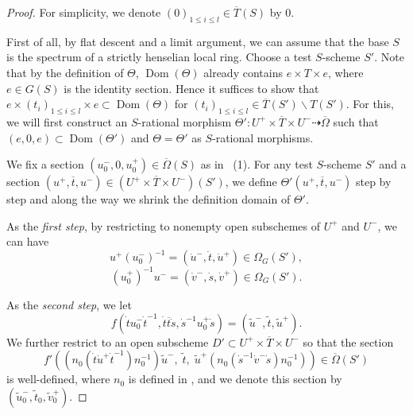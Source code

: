 \documentclass[11pt, reqno]{amsart}
\theoremstyle{plain}
\theoremstyle{definition}
\DeclareMathOperator{\Dom}{Dom} %
\begin{document}
\begin{proof} For simplicity, we denote $(0)_{1\leq i\leq l}\in \overline{T}(S)$ by $0$.

    First of all, by flat descent \cite[exposé~XVIII, proposition~1.6]{SGA3II} and a limit argument, we can assume that the base $S$ is the spectrum of a strictly henselian local ring.
    Choose a test $S$-scheme $S'$.
    Note that by the definition of $\Theta$, $\Dom(\Theta)$ already contains $e\times T\times e$, where $e\in G(S)$ is the identity section. Hence it suffices to show that $e\times (t_i)_{1\leq i\leq l}\times e\subset \Dom(\Theta)$ for $(t_i)_{1\leq i\leq l}\in \overline{T}(S')\backslash T(S')$. For this, we will first construct an $S$-rational morphism $\Theta':U^+\times \overline{T}\times U^-\dashrightarrow \overline{\Omega}$ such that $(e,0,e) \subset \Dom(\Theta')$ and $\Theta=\Theta'$ as $S$-rational morphisms.

    We fix a section $(u_0^-, 0, u_0^+)\in \overline{\Omega}(S)$ as in  ~(1).
    For any test $S$-scheme $S'$ and a section $(u^+, \overline{t}, u^-)\in (U^+\times \overline{T}\times U^-)(S')$, we define $\Theta'(u^+, \overline{t}, u^-)$ step by step and along the way we shrink the definition domain of $\Theta'$. 

 
    As the \emph{first step}, by restricting to nonempty open subschemes of $U^+$ and $U^-$, we can have 
    $$u^+(u_0^-)^{-1}=(\dot{u}^-,\dot{t}, \dot{u}^+)\in \Omega_G(S'),$$
    $$(u_0^+)^{-1}u^-=(\dot{v}^-,\dot{s}, \dot{v}^+)\in \Omega_G(S').$$

    
    As the \emph{second step}, we  let  
    $$f(\dot{t}u_0^-\dot{t}^{-1}, \dot{t}\overline{t}\dot{s}, \dot{s}^{-1}u_0^+\dot{s})=(\widetilde{u}^-, \widetilde{t}, \widetilde{u}^+).$$
    We further restrict to an open subscheme $D'\subset U^+\times\overline{T}\times U^-$ so that the section $$f'((n_0(\dot{t}\dot{u}^+\dot{t}^{-1})n_0^{-1})\widetilde{u}^-,\;\widetilde{t},\;\widetilde{u}^+(n_0(\dot{s}^{-1}\dot{v}^-\dot{s})n_0^{-1})) \in\overline{\Omega}(S')$$
is well-defined, where $n_0$ is defined in , and we denote this section by 
$(\widetilde{u}^-_0,\widetilde{t}_0,\widetilde{v}^+_0).$
    

\end{proof}
\end{document}
